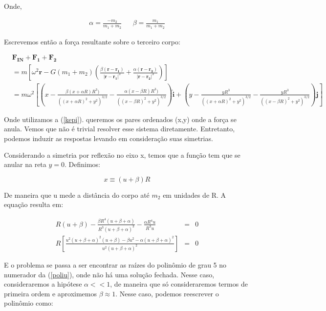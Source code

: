 Onde,

\begin{align}
\alpha = \frac{-m_2}{m_1+m_2} && \beta = \frac{m_1}{m_1+m_2}
\end{align}

Escrevemos então a força resultante sobre o terceiro corpo:


\begin{eqnarray}
& \mathbf{F_{IN}} + \mathbf{F_1} + \mathbf{F_2} \\
& = m\left[\omega^2\mathbf{r} -G(m_1+m_2)\left(\frac{\beta(\mathbf{r}-\mathbf{r_1})}{|\mathbf{r}-\mathbf{r_1}|^3} + \frac{\alpha(\mathbf{r}-\mathbf{r_2})}{|\mathbf{r}-\mathbf{r_2}|^3}\right) \right] \\
& = m\omega^2 \left[\left(x - \frac{\beta(x+\alpha R) R^3)}{((x+\alpha R)^2 + y^2)^{3/2}} - \frac{\alpha(x-\beta R) R^3)}{((x-\beta R)^2 + y^2)^{3/2}}\right)\mathbf{\hat{i}} + \left(y - \frac{y R^3}{((x+\alpha R)^2 + y^2)^{3/2}} - \frac{y R^3}{((x-\beta R)^2 + y^2)^{3/2}}\right)\mathbf{\hat{j}}\right] 
\end{eqnarray}

Onde utilizamos a (\ref{kepi}). queremos os pares ordenados (x,y) onde a força se anula. Vemos que não é trivial resolver esse sistema diretamente. Entretanto, podemos induzir as respostas levando em consideração suas simetrias.

Considerando a simetria por reflexão no eixo x, temos que a função tem que se anular na reta $y=0$. Definimos:

\begin{equation}
x \equiv (u+\beta)R
\end{equation}

De maneira que u mede a distância do corpo até $m_2$ em unidades de R. A equação resulta em:

\begin{eqnarray}
R(u+\beta) - \frac{\beta R^4(u+\beta+\alpha)}{R^3(u+\beta+\alpha)^3}- \frac{\alpha R^4u}{R^3u} & = & 0 \\
R\left[\frac{u^2(u+\beta+\alpha)^2(u+\beta)-\beta u^2 - \alpha(u+\beta+\alpha)^2}{u^2(u+\beta+\alpha)^2}\right] & = & 0 \label{poliu}
\end{eqnarray}

E o problema se passa a ser encontrar as raízes do polinômio de grau 5 no numerador da (\ref{poliu}), onde não há uma solução fechada. Nesse caso, consideraremos a hipótese $\alpha << 1$, de maneira que só consideraremos termos de primeira ordem e aproximemos $\beta \approx 1$. Nesse caso, podemos reescrever o polinômio como:

